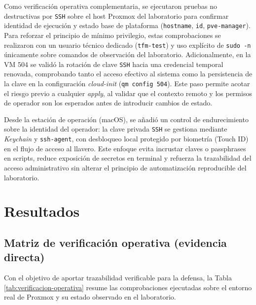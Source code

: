 \documentclass[runningheads]{llncs}
\begin{document}
Como verificación operativa complementaria, se ejecutaron pruebas no destructivas por \texttt{SSH} sobre el host Proxmox del laboratorio para confirmar identidad de ejecución y estado base de plataforma (\texttt{hostname}, \texttt{id}, \texttt{pve-manager}). Para reforzar el principio de mínimo privilegio, estas comprobaciones se realizaron con un usuario técnico dedicado (\texttt{tfm-test}) y uso explícito de \texttt{sudo -n} únicamente sobre comandos de observación del laboratorio. Adicionalmente, en la VM 504 se validó la rotación de clave \texttt{SSH} hacia una credencial temporal renovada, comprobando tanto el acceso efectivo al sistema como la persistencia de la clave en la configuración \textit{cloud-init} (\texttt{qm config 504}). Este paso permite acotar el riesgo previo a cualquier \textit{apply}, al validar que el contexto remoto y los permisos de operador son los esperados antes de introducir cambios de estado.

Desde la estación de operación (macOS), se añadió un control de endurecimiento sobre la identidad del operador: la clave privada \texttt{SSH} se gestiona mediante \textit{Keychain} y \texttt{ssh-agent}, con desbloqueo local protegido por biometría (Touch ID) en el flujo de acceso al llavero. Este enfoque evita incrustar claves o passphrases en scripts, reduce exposición de secretos en terminal y refuerza la trazabilidad del acceso administrativo sin alterar el principio de automatización reproducible del laboratorio.

\section{Resultados}

\subsection{Matriz de verificación operativa (evidencia directa)}
Con el objetivo de aportar trazabilidad verificable para la defensa, la Tabla \ref{tab:verificacion-operativa} resume las comprobaciones ejecutadas sobre el entorno real de Proxmox y su estado observado en el laboratorio.
\end{document}

